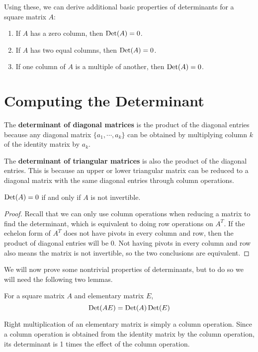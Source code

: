 Using these, we can derive additional basic properties of determinants for a square matrix $A$:
\begin{enumerate}
	\item If $A$ has a zero column, then $\operatorname{Det}(A) = 0$. 
	\item If $A$ has two equal columns, then $\operatorname{Det}(A) = 0$. 
	\item If one column of $A$ is a multiple of another, then $\operatorname{Det}(A) = 0$. 
\end{enumerate}

\section{Computing the Determinant}
The \textbf{determinant of diagonal matrices} is the product of the diagonal entries because any diagonal matrix $\{a_{1}, \cdots, a_{k}\}$ can be obtained by multiplying column $k$ of the identity matrix by $a_{k}$. 

The \textbf{determinant of triangular matrices} is also the product of the diagonal entries. This is because an upper or lower triangular matrix can be reduced to a diagonal matrix with the same diagonal entries through column operations. 

\begin{theorem}
$\operatorname{Det}(A) = 0$ if and only if $A$ is not invertible. 
\end{theorem}

\begin{proof}
Recall that we can only use column operations when reducing a matrix to find the determinant, which is equivalent to doing row operations on $A^{T}$. If the echelon form of $A^{T}$ does not have pivots in every column and row, then the product of diagonal entries will be 0. Not having pivots in every column and row also means the matrix is not invertible, so the two conclusions are equivalent. 
\end{proof}

We will now prove some nontrivial properties of determinants, but to do so we will need the following two lemmas. 

\begin{lemma}
For a square matrix $A$ and elementary matrix $E$, 
$$\operatorname{Det}(AE) = \operatorname{Det}(A) \operatorname{Det}(E)$$
\end{lemma}

\begin{lproof}
Right multiplication of an elementary matrix is simply a column operation. Since a column operation is obtained from the identity matrix by the column operation, its determinant is 1 times the effect of the column operation. 
\end{lproof}

